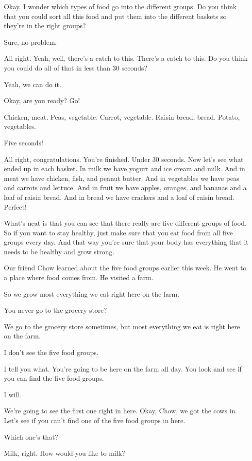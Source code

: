 Okay. I wonder which types of food go into the different groups. Do you think that you could sort all this food and put them into the different baskets so they're in the right groups?

Sure, no problem.

All right. Yeah, well, there's a catch to this. There's a catch to this. Do you think you could do all of that in less than 30 seconds?

Yeah, we can do it.

Okay, are you ready? Go!

Chicken, meat. Peas, vegetable. Carrot, vegetable. Raisin bread, bread. Potato, vegetables.

Five seconds!

All right, congratulations. You're finished. Under 30 seconds. Now let's see what ended up in each basket. In milk we have yogurt and ice cream and milk. And in meat we have chicken, fish, and peanut butter. And in vegetables we have peas and carrots and lettuce. And in fruit we have apples, oranges, and bananas and a loaf of raisin bread. And in bread we have crackers and a loaf of raisin bread. Perfect!

What's neat is that you can see that there really are five different groups of food. So if you want to stay healthy, just make sure that you eat food from all five groups every day. And that way you're sure that your body has everything that it needs to be healthy and grow strong.

Our friend Chow learned about the five food groups earlier this week. He went to a place where food comes from. He visited a farm.

So we grow most everything we eat right here on the farm.

You never go to the grocery store?

We go to the grocery store sometimes, but most everything we eat is right here on the farm.

I don't see the five food groups.

I tell you what. You're going to be here on the farm all day. You look and see if you can find the five food groups.

I will.

We're going to see the first one right in here. Okay, Chow, we got the cows in. Let's see if you can't find one of the five food groups in here.

Which one's that?

Milk, right. How would you like to milk?

